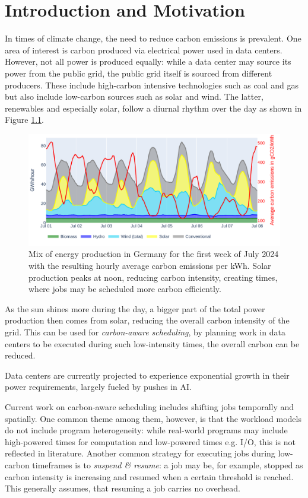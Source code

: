 \chapter{Introduction and Motivation}

In times of climate change, the need to reduce carbon emissions is prevalent. 
One area of interest is carbon produced via electrical power used in data centers. 
However, not all power is produced equally: while a data center may source its power from the public grid, the public grid itself is sourced from different producers. 
These include high-carbon intensive technologies such as coal and gas but also include low-carbon sources such as solar and wind. 
The latter, renewables and especially solar, follow a diurnal rhythm over the day as shown in Figure \ref{fig:energy_mix}.

\begin{figure}
    \includegraphics[width=\linewidth]{agorameter/energy_production_week.pdf}
    \caption[short]{Mix of energy production in Germany for the first week of July 2024 with the resulting hourly average carbon emissions per kWh. Solar production peaks at noon, reducing carbon intensity, creating times, where jobs may be scheduled more carbon efficiently.}
    \label{fig:energy_mix}
\end{figure}

As the sun shines more during the day, a bigger part of the total power production then comes from solar, reducing the overall carbon intensity of the grid.
This can be used for \emph{carbon-aware scheduling}, by planning work in data centers to be executed during such low-intensity times, the overall carbon can be reduced.

Data centers are currently projected to experience exponential growth in their power requirements, largely fueled by pushes in AI.\cite{schwartz_green_2019}

Current work on carbon-aware scheduling includes shifting jobs temporally and spatially. 
One common theme among them, however, is that the workload models do not include program heterogeneity: while real-world programs may include high-powered times for computation and low-powered times e.g. I/O, this is not reflected in literature. 
Another common strategy for executing jobs during low-carbon timeframes is to \emph{suspend \& resume}: a job may be, for example, stopped as carbon intensity is increasing and resumed when a certain threshold is reached. 
This generally assumes, that resuming a job carries no overhead. 

